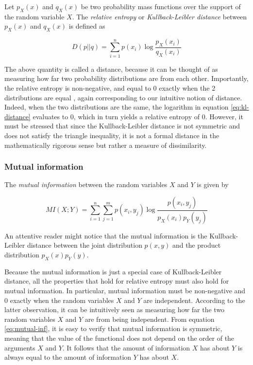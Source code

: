 \documentclass[12pt]{article}
\begin{document}
Let $p_X(x)$ and $q_X(x)$ be two probability mass functions over the support of the random variable $X$. The \textit{relative entropy} or \textit{Kullback-Leibler distance} \cite{cover-thomas} between $p_X(x)$ and $q_X(x)$ is defined as

\begin{equation}
D(p||q) = \sum_{i = 1}^n p(x_i) \log \frac{p_X(x_i)}{q_X(x_i)}
\label{eq:kl-distance}
\end{equation} 

The above quantity is called a distance, because it can be thought of as measuring how far two probability distributions are from each other. Importantly, the relative entropy is non-negative, and equal to 0 exactly when the 2 distributions are equal \cite{cover-thomas}, again corresponding to our intuitive notion of distance. Indeed, when the two distributions are the same, the logarithm in equation \ref{eq:kl-distance} evaluates to 0, which in turn yields a relative entropy of 0. However, it must be stressed that since the Kullback-Leibler distance is not symmetric and does not satisfy the triangle inequality, it is not a formal distance in the mathematically rigorous sense but rather a measure of dissimilarity.

\subsubsection{Mutual information}

The \textit{mutual information} \cite{cover-thomas} between the random variables $X$ and $Y$ is given by 

\begin{equation}
MI(X;Y) = \sum_{i=1}^n \sum_{j=1}^m p(x_i,y_j) \log \frac{p(x_i,y_j)}{p_X(x_i)p_Y(y_j)}
\label{eq:mutual-inf}
\end{equation}

An attentive reader might notice that the mutual information is the Kullback-Leibler distance between the joint distribution $p(x,y)$ and the product distribution $p_X(x)p_Y(y)$.

Because the mutual information is just a special case of Kullback-Leibler distance, all the properties that hold for relative entropy must also hold for mutual information. In particular, mutual information must be non-negative and 0 exactly when the random variables $X$ and $Y$ are independent. According to the latter observation, it can be intuitively seen as measuring how far the two random variables $X$ and $Y$ are from being independent. From equation \ref{eq:mutual-inf}, it is easy to verify that mutual information is symmetric, meaning that the value of the functional does not depend on the order of the arguments $X$ and $Y$. It follows that the amount of information $X$ has about $Y$ is always equal to the amount of information $Y$ has about $X$. 
\end{document}
